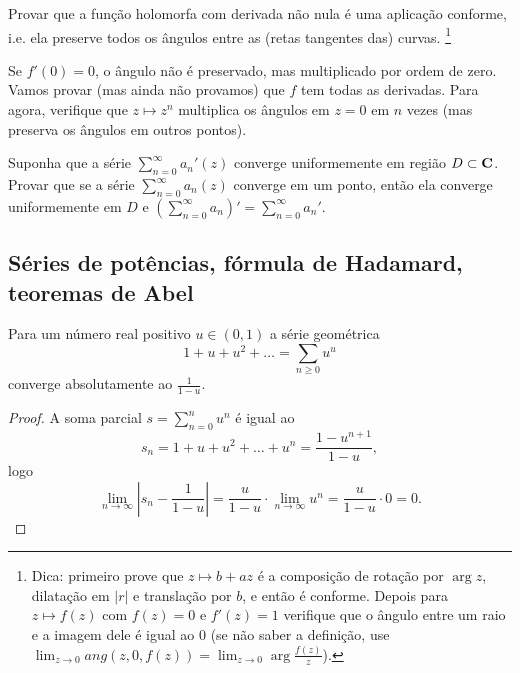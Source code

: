\begin{problema}
Provar que a função holomorfa com derivada não nula é uma aplicação conforme,
i.e. ela preserve todos os ângulos entre as (retas tangentes das) curvas.
\footnote{
Dica: primeiro prove que $z \mapsto b+ a z$ é a composição de rotação por $\arg z$, dilatação em $|r|$
e translação por $b$, e então é conforme.
Depois para $z \mapsto f(z)$ com $f(z) = 0$ e $f'(z)=1$ verifique que o ângulo entre um raio e a imagem dele
é igual ao $0$ (se não saber a definição, use $\lim_{z\to 0} ang(z,0,f(z)) = \lim_{z\to 0} \arg \frac{f(z)}{z}$).
}
\end{problema}

Se $f'(0)=0$, o ângulo não é preservado, mas multiplicado por ordem de zero. Vamos provar (mas ainda não provamos) que $f$ tem todas as derivadas. Para agora, verifique que $z\mapsto z^n$ multiplica os ângulos em $z=0$ em $n$ vezes
(mas preserva os ângulos em outros pontos).


\begin{problema}
\label{pre-weierstrass}
Suponha que a série $\sum_{n=0}^\infty a_n'(z)$ converge uniformemente em região $D\subset \mathbf{C}$.
Provar que se a série $\sum_{n=0}^\infty a_n(z)$ converge em um ponto,
então ela converge uniformemente em $D$ e $(\sum_{n=0}^\infty a_n)' = \sum_{n=0}^\infty a_n'$.
\end{problema}


\subsection{Séries de potências, fórmula de Hadamard, teoremas de Abel}

\begin{prop}
Para um número real positivo $u\in(0,1)$ a série geométrica
\[ 1 + u + u^2 + \dots = \sum_{n\geq 0} u^u \]
converge absolutamente ao $\frac{1}{1-u}$.
\end{prop}
\begin{proof}
A soma parcial $s = \sum_{n=0}^n u^n$ é igual ao
\[ s_n = 1 + u + u^2 + \dots + u^n = \frac{1-u^{n+1}}{1-u}, \]
logo
\[ \lim_{n\to\infty} |s_n - \frac{1}{1-u}|
 = \frac{u}{1-u} \cdot \lim_{n\to\infty} u^n
 = \frac{u}{1-u} \cdot 0 = 0. \]
\end{proof}

